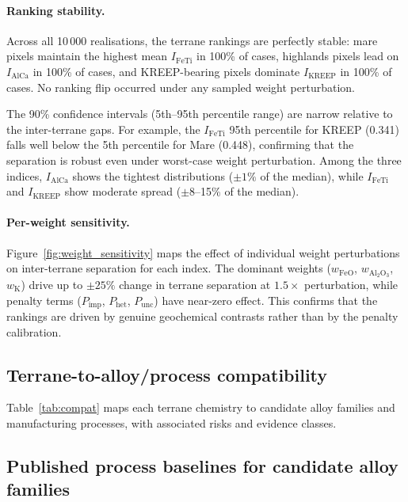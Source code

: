 \documentclass[11pt,a4paper]{article}
\begin{document}
\paragraph{Ranking stability.}
Across all 10\,000 realisations, the terrane rankings are perfectly stable: mare pixels maintain the highest mean $I_{\text{FeTi}}$ in 100\% of cases, highlands pixels lead on $I_{\text{AlCa}}$ in 100\% of cases, and KREEP-bearing pixels dominate $I_{\text{KREEP}}$ in 100\% of cases. No ranking flip occurred under any sampled weight perturbation.

The 90\% confidence intervals (5th--95th percentile range) are narrow relative to the inter-terrane gaps. For example, the $I_{\text{FeTi}}$ 95th percentile for KREEP (0.341) falls well below the 5th percentile for Mare (0.448), confirming that the separation is robust even under worst-case weight perturbation. Among the three indices, $I_{\text{AlCa}}$ shows the tightest distributions ($\pm 1\%$ of the median), while $I_{\text{FeTi}}$ and $I_{\text{KREEP}}$ show moderate spread ($\pm 8$--15\% of the median).

\paragraph{Per-weight sensitivity.}
Figure~\ref{fig:weight_sensitivity} maps the effect of individual weight perturbations on inter-terrane separation for each index. The dominant weights ($w_{\mathrm{FeO}}$, $w_{\mathrm{Al_2O_3}}$, $w_{\mathrm{K}}$) drive up to $\pm 25\%$ change in terrane separation at $1.5\times$ perturbation, while penalty terms ($P_{\mathrm{imp}}$, $P_{\mathrm{het}}$, $P_{\mathrm{unc}}$) have near-zero effect. This confirms that the rankings are driven by genuine geochemical contrasts rather than by the penalty calibration.

\subsection{Terrane-to-alloy/process compatibility}

Table~\ref{tab:compat} maps each terrane chemistry to candidate alloy families and manufacturing processes, with associated risks and evidence classes.

\subsection{Published process baselines for candidate alloy families}
\end{document}

